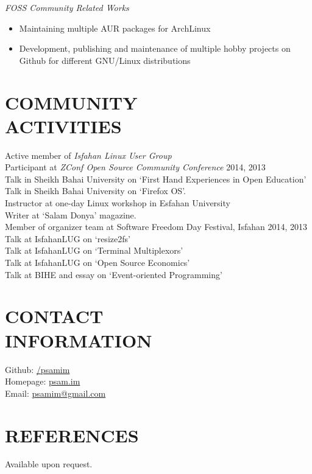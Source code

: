 \documentclass[margin, 10pt]{res} %
\begin{document}
\begin{resume}
{\sl FOSS Community Related Works}\hfil \\
\begin{itemize}
\item Maintaining multiple AUR packages for ArchLinux
\item Development, publishing and maintenance of multiple hobby projects on Github for
  different GNU/Linux distributions
\end{itemize} 


\section{COMMUNITY \\ ACTIVITIES}

Active member of {\it Isfahan Linux User Group} \\
Participant at {\it ZConf Open Source Community Conference} 2014, 2013 \\
Talk in Sheikh Bahai University on `First Hand Experiences in Open Education' \\
Talk in Sheikh Bahai University on `Firefox OS'. \\
Instructor at one-day Linux workshop in Esfahan University \\
Writer at `Salam Donya' magazine. \\
Member of organizer team at Software Freedom Day Festival, Isfahan 2014, 2013 \\
Talk at IsfahanLUG on `resize2fs' \\
Talk at IsfahanLUG on `Terminal Multiplexors' \\
Talk at IsfahanLUG on `Open Source Economics' \\
Talk at BIHE and essay on `Event-oriented Programming'


\section{CONTACT \\ INFORMATION}
Github: \href{http://github.com/psamim}{/\/psamim} \\
Homepage: \href{http://www.psam.im/}{psam.im} \\
Email: \href{mailto:psamim@gmail.com}{psamim@gmail.com}

\section{REFERENCES}
Available upon request.


\end{resume}
\end{document}
